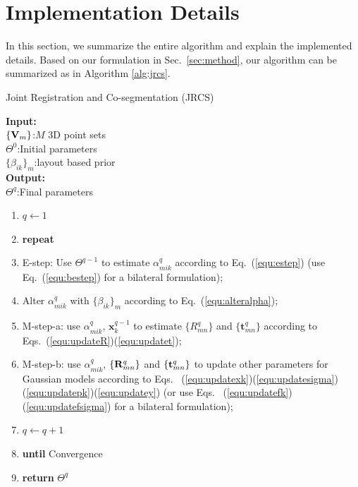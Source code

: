 \section{Implementation Details}
\label{sec:imp}

In this section, we summarize the entire algorithm and explain the implemented details.
%
Based on our formulation in Sec.~\ref{sec:method}, our algorithm can be summarized as in Algorithm \ref{alg:jrcs}.
\begin{algorithm}[htb]
	\caption{Joint Registration and Co-segmentation (JRCS)}
	\label{alg:jrcs}
	\textbf{Input:}~~\\
	$\{\mathbf{V}_m\}$:$M$ 3D point sets\\
	$\Theta^0$:Initial parameters\\
	$\{\beta_{ik}\}_{m}$:layout based prior\\
	\textbf{Output:}~~\\
	$\Theta^q$:Final parameters~~
	\begin{enumerate}
		\item $q\leftarrow1$
		\item \textbf{repeat}
		\item E-step: Use $\Theta^{q-1}$ to estimate $\alpha_{mik}^q$ according to Eq.~(\ref{equ:estep}) (use Eq.~(\ref{equ:bestep}) for a bilateral formulation);
		\item Alter $\alpha_{mik}^q$ with $\{\beta_{ik}\}_{m}$ according to Eq.~(\ref{equ:alteralpha});
		\item M-step-a: use $\alpha^q_{mik}$, $\pmb x^{q-1}_k$ to estimate $\{R_{mn}^q\}$ and $\{\pmb t_{mn}^q\}$ according to Eqs.~(\ref{equ:updateR})(\ref{equ:updatet});
		\item M-step-b: use $\alpha^q_{mik}$, $\{\mathbf{R}_{mn}^q\}$ and $\{\mathbf{t}_{mn}^q\}$ to update other parameters for Gaussian models according to Eqs.~ (\ref{equ:updatexk})(\ref{equ:updatesigma})(\ref{equ:updatepk})(\ref{equ:updatey})  (or use Eqs.~ (\ref{equ:updatefk})(\ref{equ:updatefsigma}) for a bilateral formulation);
		\item $q \leftarrow q+1$
		\item \textbf{until} Convergence 
		\item \textbf{return} $\Theta^q$
	\end{enumerate}
\end{algorithm}



